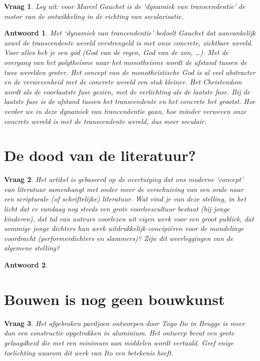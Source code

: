\documentclass{article}
\theoremstyle{plain}
\newtheorem{question}{Vraag}
\theoremstyle{nonumberplain}
\newtheorem{answer}{Antwoord}
\begin{document}
\begin{question}
Leg uit: voor Marcel Gauchet is de ‘dynamiek van transcendentie’ de motor van de
ontwikkeling in de richting van secularisatie.
\end{question}

\begin{answer}
Met `dynamiek van trancendentie' bedoelt Gauchet dat aanvankelijk zowel de transcendente wereld verstrengeld is met onze concrete, zichtbare wereld. Voor alles heb je een god (God van de regen, God van de zon, \dots). Met de overgang van het polythe\"isme naar het monothe\"isme wordt de afstand tussen de twee werelden groter. Het concept van de monothe\"istische God is al veel abstracter en de verwevenheid met de concrete wereld een stuk kleiner. Het Christendom wordt als de voorlaatste fase gezien, met de verlichting als de laatste fase. Bij de laatste fase is de afstand tussen het transcendente en het concrete het grootst. Hoe verder we in deze dynamiek van trancendentie gaan, hoe minder verweven onze concrete wereld is met de transcendente wereld, dus meer seculair.
\end{answer}

\section{De dood van de literatuur?}

\begin{question}
Het artikel is gebaseerd op de overtuiging dat ons moderne ‘concept’ van
literatuur samenhangt met onder meer de verschuiving van een orale naar een
scripturale (of schriftelijke) literatuur. Wat vind je van deze stelling, in het
licht dat er vandaag nog steeds een grote voorleescultuur bestaat (bij jonge
kinderen), dat tal van auteurs voorlezen uit eigen werk voor een groot publiek,
dat sommige jonge dichters hun werk uitdrukkelijk concipiëren voor de mondelinge
voordracht (performerdichters en slammers)? Zijn dit weerleggingen van de
algemene stelling?
\end{question}

\begin{answer}

\end{answer}

\section{Bouwen is nog geen bouwkunst}

\begin{question}
Het afgebroken paviljoen ontworpen door Toyo Ito in Brugge is meer dan een
constructie opgetrokken in aluminium. Het ontwerp bevat een grote gelaagdheid
die met een minimum aan middelen wordt vertaald. Geef enige toelichting waarom
dit werk van Ito een betekenis heeft.
\end{question}
\end{document}

